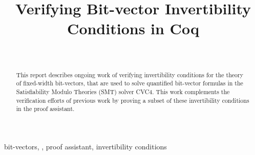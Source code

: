 \documentclass[10pt,conference]{IEEEtran}
\begin{document}
\title{Verifying Bit-vector Invertibility Conditions in Coq}


\author{
\\
}

\maketitle



\begin{abstract}
This report describes ongoing work of verifying invertibility 
conditions for the theory of fixed-width bit-vectors, 
that are used 
to solve quantified bit-vector formulas in the 
Satisfiability Modulo Theories (SMT) solver CVC4. 
This work complements the verification 
efforts of previous work by proving a subset of these
invertibility conditions in the \coq proof assistant. 

\end{abstract}

\begin{IEEEkeywords}
bit-vectors, \coq, proof assistant, invertibility conditions
\end{IEEEkeywords}
\end{document}
